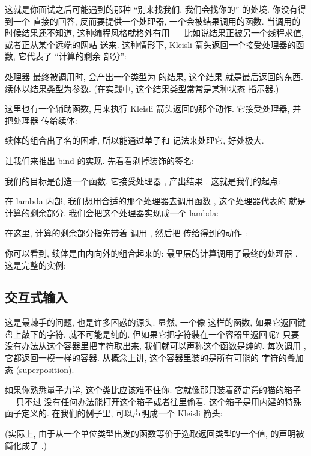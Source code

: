 这就是你面试之后可能遇到的那种 ``别来找我们, 我们会找你的'' 的处境. 你没有得到一个
直接的回答, 反而要提供一个处理器, 一个会被结果调用的函数. 当调用的时候结果还不知道,
这种编程风格就格外有用 --- 比如说结果正被另一个线程求值, 或者正从某个远端的网站
送来. 这种情形下, Kleisli 箭头返回一个接受处理器的函数, 它代表了 ``计算的剩余
部分'':

处理器  最终被调用时, 会产出一个类型为  的结果, 这个结果
就是最后返回的东西. 续体以结果类型为参数. (在实践中, 这个结果类型常常是某种状态
指示器.)

这里也有一个辅助函数, 用来执行 Kleisli 箭头返回的那个动作. 它接受处理器, 并把处理器
传给续体:

续体的组合出了名的困难, 所以能通过单子和  记法来处理它, 好处极大.

让我们来推出 bind 的实现. 先看看剥掉装饰的签名:

我们的目标是创造一个函数, 它接受处理器 , 产出结果 .
这就是我们的起点:

在 lambda 内部, 我们想用合适的那个处理器去调用函数 , 这个处理器代表的
就是计算的剩余部分. 我们会把这个处理器实现成一个 lambda:

在这里, 计算的剩余部分指先带着  调用 , 然后把 
传给得到的动作 :

你可以看到, 续体是由内向外的组合起来的: 最里层的计算调用了最终的处理器
. 这是完整的实例:


\subsection{交互式输入}

这是最棘手的问题, 也是许多困惑的源头. 显然, 一个像  这样的函数,
如果它返回键盘上敲下的字符, 就不可能是纯的. 但如果它把字符装在一个容器里返回呢?
只要没有办法从这个容器里把字符取出来, 我们就可以声称这个函数是纯的. 每次调用
, 它都返回一模一样的容器. 从概念上讲, 这个容器里装的是所有可能的
字符的叠加态 (superposition).

如果你熟悉量子力学, 这个类比应该难不住你. 它就像那只装着薛定谔的猫的箱子 --- 只不过
没有任何办法能打开这个箱子或者往里偷看. 这个箱子是用内建的特殊  函子定义的.
在我们的例子里,  可以声明成一个 Kleisli 箭头:

(实际上, 由于从一个单位类型出发的函数等价于选取返回类型的一个值, 
的声明被简化成了 .)

